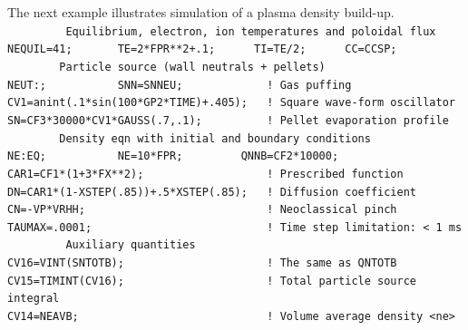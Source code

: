 The next example illustrates simulation of a plasma density build-up.
\smallskip\\
{\tt\hspace*{1mm}
~~~~~~~~Equilibrium, electron, ion temperatures and poloidal flux
\\ \hspace*{1mm}
NEQUIL=41;~~~~~~~TE=2*FPR**2+.1;~~~~~~TI=TE/2;~~~~~~CC=CCSP;
\smallskip\\ \hspace*{1mm}
~~~~~~~~Particle source (wall neutrals + pellets)
\\ \hspace*{1mm}
NEUT:;~~~~~~~~~~~SNN=SNNEU;~~~~~~~~~~~~~! Gas puffing
\\ \hspace*{1mm}
CV1=anint(.1*sin(100*GP2*TIME)+.405);~~~! Square wave-form oscillator
\\ \hspace*{1mm}
SN=CF3*30000*CV1*GAUSS(.7,.1);~~~~~~~~~~! Pellet evaporation profile
\smallskip\\ \hspace*{1mm}
~~~~~~~~Density eqn with initial and boundary conditions
\\ \hspace*{1mm}
NE:EQ;~~~~~~~~~~~NE=10*FPR;~~~~~~~~~QNNB=CF2*10000;
\\ \hspace*{1mm}
CAR1=CF1*(1+3*FX**2);~~~~~~~~~~~~~~~~~~~! Prescribed function
\\ \hspace*{1mm}
DN=CAR1*(1-XSTEP(.85))+.5*XSTEP(.85);~~~! Diffusion coefficient
\\ \hspace*{1mm}
CN=-VP*VRHH;~~~~~~~~~~~~~~~~~~~~~~~~~~~~! Neoclassical pinch
\\ \hspace*{1mm}
TAUMAX=.0001;~~~~~~~~~~~~~~~~~~~~~~~~~~~! Time step limitation: < 1 ms
\smallskip\\ \hspace*{1mm}
~~~~~~~~~Auxiliary quantities
\\ \hspace*{1mm}
CV16=VINT(SNTOTB);~~~~~~~~~~~~~~~~~~~~~~! The same as QNTOTB
\\ \hspace*{1mm}
CV15=TIMINT(CV16);~~~~~~~~~~~~~~~~~~~~~~! Total particle source integral
\\ \hspace*{1mm}
CV14=NEAVB;~~~~~~~~~~~~~~~~~~~~~~~~~~~~~! Volume average density <ne>
}
